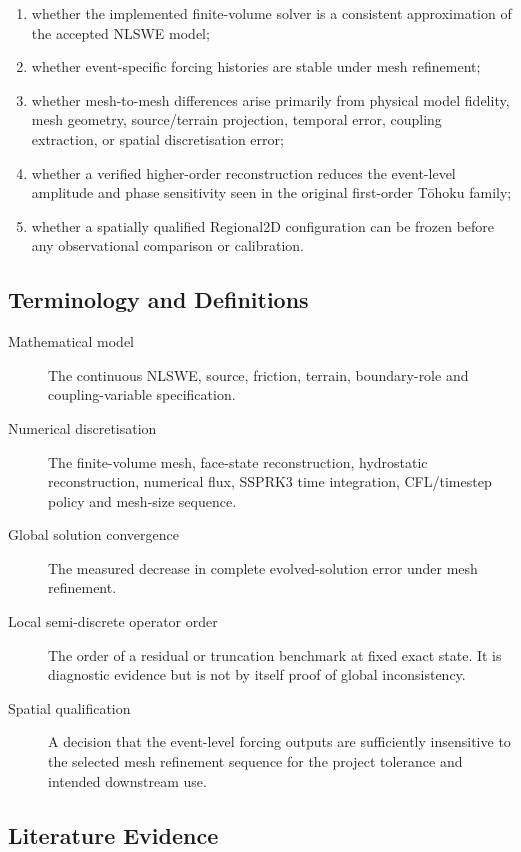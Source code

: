 \begin{enumerate}
  \item whether the implemented finite-volume solver is a consistent
    approximation of the accepted NLSWE model;
  \item whether event-specific forcing histories are stable under mesh
    refinement;
  \item whether mesh-to-mesh differences arise primarily from physical
    model fidelity, mesh geometry, source/terrain projection, temporal
    error, coupling extraction, or spatial discretisation error;
  \item whether a verified higher-order reconstruction reduces the
    event-level amplitude and phase sensitivity seen in the original
    first-order Tōhoku family;
  \item whether a spatially qualified Regional2D configuration can be
    frozen before any observational comparison or calibration.
\end{enumerate}

\subsection{Terminology and Definitions}
\label{sec:res-ver-cnv-definitions}

\begin{description}
  \item[Mathematical model] The continuous NLSWE, source, friction,
    terrain, boundary-role and coupling-variable specification.
  \item[Numerical discretisation] The finite-volume mesh, face-state
    reconstruction, hydrostatic reconstruction, numerical flux, SSPRK3
    time integration, CFL/timestep policy and mesh-size sequence.
  \item[Global solution convergence] The measured decrease in complete
    evolved-solution error under mesh refinement.
  \item[Local semi-discrete operator order] The order of a residual or
    truncation benchmark at fixed exact state. It is diagnostic evidence
    but is not by itself proof of global inconsistency.
  \item[Spatial qualification] A decision that the event-level forcing
    outputs are sufficiently insensitive to the selected mesh refinement
    sequence for the project tolerance and intended downstream use.
\end{description}

\subsection{Literature Evidence}
\label{sec:res-ver-cnv-literature-evidence}

